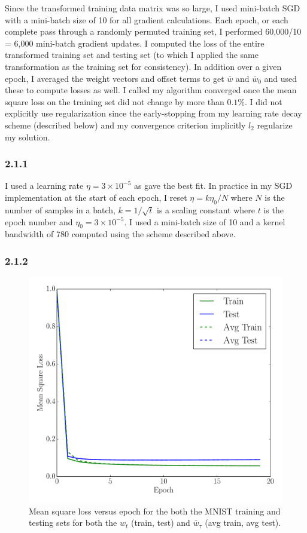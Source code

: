 \documentclass[12pt]{amsart}
\begin{document}
Since the transformed training data matrix was so large, I used mini-batch SGD with a mini-batch size of 10 for all gradient calculations.  Each epoch, or each complete pass through a randomly permuted training set, I performed 60,000/10 = 6,000 mini-batch gradient updates.  I computed the loss of the entire transformed training set and testing set (to which I applied the same transformation as the training set for consistency).  In addition over a given epoch, I averaged the weight vectors and offset terms to get $\bar{w}$ and $\bar{w}_0$ and used these to compute losses as well.  I called my algorithm converged once the mean square loss on the training set did not change by more than $0.1\%$.  I did not explicitly use regularization since the early-stopping from my learning rate decay scheme (described below) and my convergence criterion implicitly $l_2$ regularize my solution.

\subsubsection*{2.1.1}

I used a learning rate $\eta = 3 \times 10^{-5}$ as gave the best fit.  In practice in my SGD implementation at the start of each epoch, I reset $\eta = k\eta_0/N$ where $N$ is the number of samples in a batch, $k = 1/\sqrt{t}$ is a scaling constant where $t$ is the epoch number and $\eta_0 = 3 \times 10^{-5}$.  I used a mini-batch size of 10 and a kernel bandwidth of 780 computed using the scheme described above.

\subsubsection*{2.1.2}
\begin{figure}[H]
	\includegraphics[width=\columnwidth]{pca_square_loss.pdf}
    \caption{Mean square loss versus epoch for the both the MNIST training and testing sets for both the $w_t$ (train, test) and $\bar{w}_{\tau}$ (avg train, avg test).}
    \label{fig:pca_square_loss}
\end{figure}
\end{document}
